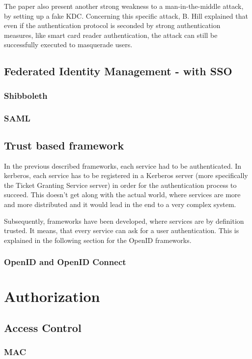 The paper also present another strong weakness to a man-in-the-middle attack, by setting up a fake KDC. Concerning this specific attack, B. Hill explained that even if the authentication protocol is seconded by strong authentication measures, like smart card reader authentication,  the attack can still be successfully executed to masquerade users\cite{Consultant}.

\subsection{Federated Identity Management - with SSO} 
\subsubsection{Shibboleth}
\subsubsection{SAML}

\subsection{Trust based framework}
In the previous described frameworks, each service had to be authenticated. In kerberos, each service has to be registered in a Kerberos server (more specifically the Ticket Granting Service server) in order for the authentication process to succeed. This doesn't get along with the actual world, where services are more and more distributed and it would lead in the end to a very complex system. 

Subsequently, frameworks have been developed, where services are by definition trusted. It means, that every service can ask for a user authentication. This is explained in the following section for the OpenID frameworks.
 
\subsubsection{OpenID and OpenID Connect}


\section{Authorization}
\subsection{Access Control}
\subsubsection{MAC}
